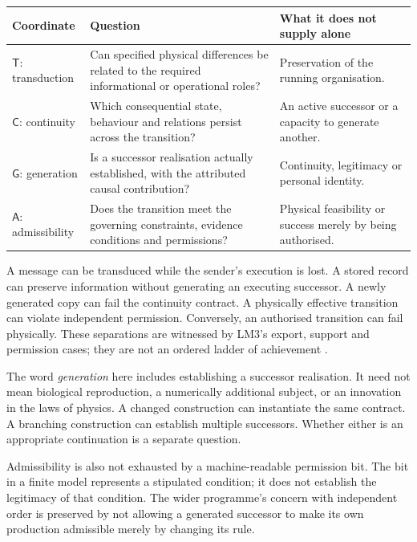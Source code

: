 \begin{center}
\begin{tabularx}{\linewidth}{@{}p{.19\linewidth}Y Y@{}}
\toprule
Coordinate & Question & What it does not supply alone\\
\midrule
\(\mathsf T\): transduction & Can specified physical differences be related to the required informational or operational roles? & Preservation of the running organisation.\\
\(\mathsf C\): continuity & Which consequential state, behaviour and relations persist across the transition? & An active successor or a capacity to generate another.\\
\(\mathsf G\): generation & Is a successor realisation actually established, with the attributed causal contribution? & Continuity, legitimacy or personal identity.\\
\(\mathsf A\): admissibility & Does the transition meet the governing constraints, evidence conditions and permissions? & Physical feasibility or success merely by being authorised.\\
\bottomrule
\end{tabularx}
\end{center}

A message can be transduced while the sender's execution is lost. A stored record can preserve information without generating an executing successor. A newly generated copy can fail the continuity contract. A physically effective transition can violate independent permission. Conversely, an authorised transition can fail physically. These separations are witnessed by LM3's export, support and permission cases; they are not an ordered ladder of achievement \cite[\S\S7,12,14,18]{LM3}.

The word \emph{generation} here includes establishing a successor realisation. It need not mean biological reproduction, a numerically additional subject, or an innovation in the laws of physics. A changed construction can instantiate the same contract. A branching construction can establish multiple successors. Whether either is an appropriate continuation is a separate question.

Admissibility is also not exhausted by a machine-readable permission bit. The bit in a finite model represents a stipulated condition; it does not establish the legitimacy of that condition. The wider programme's concern with independent order is preserved by not allowing a generated successor to make its own production admissible merely by changing its rule.

